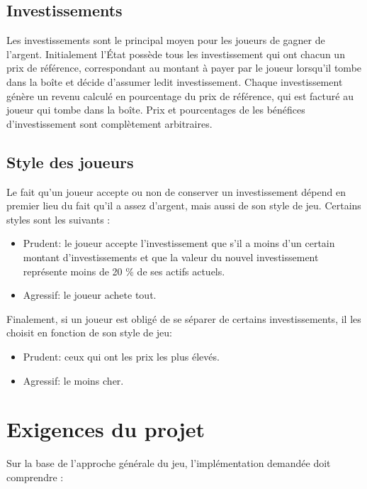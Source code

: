\documentclass[12pt]{article}
\begin{document}
    \subsection{Investissements}
Les investissements sont le principal moyen pour les joueurs de gagner de l'argent. Initialement
l'\'Etat possède tous les investissement qui ont chacun un prix de référence, correspondant au
montant à payer par le joueur lorsqu'il tombe dans la boîte et décide d'assumer ledit
investissement.
Chaque investissement génère un revenu calculé en pourcentage du prix de
référence, qui est facturé au joueur qui tombe dans la boîte. Prix et pourcentages de
les bénéfices d'investissement sont complètement arbitraires.

    \subsection{Style des joueurs}

    Le fait qu'un joueur accepte ou non de conserver un investissement dépend en premier lieu 
    du fait qu'il a assez d'argent, mais aussi de son style de jeu. 
    Certains styles sont les suivants :
        \begin{itemize}
           \item Prudent: le joueur accepte l'investissement que s'il a moins d'un certain montant 
           d'investissements et que la valeur du nouvel investissement représente moins de 20 \% de ses
           actifs actuels.
           \item  Agressif: le joueur achete tout.
        \end{itemize}

    Finalement, si un joueur est obligé de se séparer de certains investissements, 
        il les choisit en fonction de son style de jeu:
        \begin{itemize}
            \item Prudent: ceux qui ont les prix les plus élevés.
            \item Agressif: le moins cher.
        \end{itemize}


        
\section{Exigences du projet}
Sur la base de l'approche générale du jeu, 
l'implémentation demandée doit comprendre :
\end{document}

